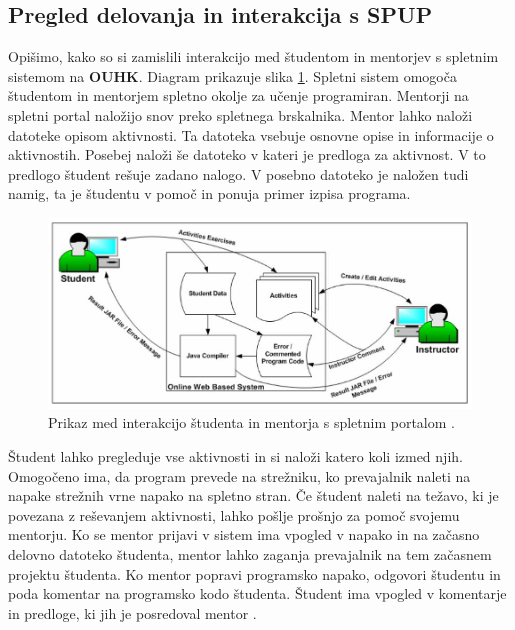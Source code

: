 \subsection{Pregled delovanja in interakcija s SPUP}
\label{sec:pregled_delovanja_in_interakcija}

Opišimo, kako so si zamislili interakcijo med študentom in mentorjev s
spletnim sistemom na \textbf{OUHK}. Diagram prikazuje slika
\ref{fig:OUHK_workFlow}. Spletni sistem omogoča študentom in mentorjem
spletno okolje za učenje programiran. Mentorji na spletni portal
naložijo snov preko spletnega brskalnika. Mentor lahko naloži datoteke
opisom aktivnosti. Ta datoteka vsebuje osnovne opise in informacije o
aktivnostih. Posebej naloži še datoteko v kateri je predloga za
aktivnost. V to predlogo študent rešuje zadano nalogo. V posebno
datoteko je naložen tudi namig, ta je študentu v pomoč in ponuja
primer izpisa programa.

\begin{figure}[htb!] \centering
  \includegraphics[width=0.9\linewidth, keepaspectratio =
1]{./images/SystemArch02_OUHK_DistanceEdu.jpg}
\caption{Prikaz med interakcijo študenta in mentorja s spletnim
  portalom \cite{ITaLCP_DistanceEdu}.}
  \label{fig:OUHK_workFlow}
\end{figure}

Študent lahko pregleduje vse aktivnosti in si naloži katero koli izmed
njih. Omogočeno ima, da program prevede na strežniku, ko prevajalnik
naleti na napake strežnih vrne napako na spletno stran. Če študent
naleti na težavo, ki je povezana z reševanjem aktivnosti, lahko pošlje
prošnjo za pomoč svojemu mentorju. Ko se mentor prijavi v sistem ima
vpogled v napako in na začasno delovno datoteko študenta, mentor lahko
zaganja prevajalnik na tem začasnem projektu študenta. Ko mentor
popravi programsko napako, odgovori študentu in poda komentar na
programsko kodo študenta. Študent ima vpogled v komentarje in
predloge, ki jih je posredoval mentor \cite{ITaLCP_DistanceEdu}.

